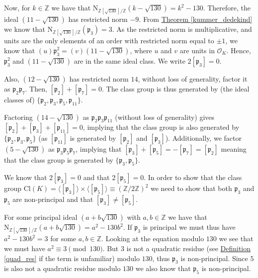 \documentclass[openany, a4paper, 10pt]{book}
\theoremstyle{plain}
\theoremstyle{plain}
\theoremstyle{plain}
\theoremstyle{definition}
\theoremstyle{plain}
\theoremstyle{definition}
\theoremstyle{remark}
\newcommand{\defref}[1]{\hyperref[#1]{Definition \ref{#1}}}
\newcommand{\theoref}[1]{\hyperref[#1]{Theorem \ref{#1}}}
\begin{document}
\begin{examplebox}
    Now, for $k \in \mathbb Z$ we have that $\mathrm{N}_{\mathbb Z[\sqrt{130}] / \mathbb Z} (k-\sqrt{130}) = k^2 - 130$.
    Therefore, the ideal $(11-\sqrt{130})$ has restricted norm $-9$.
    From \theoref{kummer_dedekind} we know that $\mathrm{N}_{\mathbb Z[\sqrt{130}] / \mathbb Z} (\mathfrak p_3) = 3$.
    As the restricted norm is multiplicative, and units are the only elements of an order with restricted norm equal to $\pm 1$, we know that $(u)\mathfrak p_3^2 = (v)(11 - \sqrt{130})$, where $u$ and $v$ are units in $\mathcal O_K$.
    Hence, $\mathfrak p_3^2$ and $(11 - \sqrt{130})$ are in the same ideal class.
    We write $2[\mathfrak p_3] = 0$.

    Also, $(12-\sqrt{130})$ has restricted norm $14$, without loss of generality, factor it as $\mathfrak p_2 \mathfrak p_7$.
    Then, $[\mathfrak p_2] + [\mathfrak p_7] = 0$.
    The class group is thus generated by (the ideal classes of) $\{ \mathfrak p_2, \mathfrak p_3, \mathfrak p_5, \mathfrak p_{11} \}$.

    Factoring $(14-\sqrt{130})$ as $\mathfrak p_2 \mathfrak p_3 \mathfrak p_{11}$ (without loss of generality) gives $[\mathfrak p_2] +  [\mathfrak p_3] +  [\mathfrak p_{11}] = 0$,
    implying that the class group is also generated by $\{ \mathfrak p_2, \mathfrak p_3, \mathfrak p_5\}$ (as $[\mathfrak p_{11}]$ is generated by $[\mathfrak p_2]$ and $[\mathfrak p_3]$).
    Additionally, we factor $(5-\sqrt{130})$ as $\mathfrak p_3 \mathfrak p_5 \mathfrak p_7$,
    implying that $[\mathfrak p_3] + [\mathfrak p_5] = -[\mathfrak p_7] = [\mathfrak p_2]$ meaning that the class group is generated by $\{ \mathfrak p_3, \mathfrak p_5 \}$.

    We know that $2[\mathfrak p_3] = 0$ and that $2[\mathfrak p_5] = 0$.
    In order to show that the class group $\mathrm{Cl}(K) = \langle [\mathfrak p_3] \rangle \times \langle [\mathfrak p_5] \rangle \equiv (\mathbb Z / 2 \mathbb Z)^2$
    we need to show that both $\mathfrak p_3$ and $\mathfrak p_5$ are non-principal and that $[\mathfrak p_3] \neq [\mathfrak p_5]$.

    For some principal ideal $(a+b\sqrt{130})$ with $a, b \in \mathbb Z$ we have that $\mathrm{N}_{\mathbb Z[\sqrt{130}] / \mathbb Z} (a + b\sqrt{130}) = a^2 - 130 b^2$.
    If $\mathfrak p_3$ is principal we must thus have $a^2-130b^2 = 3$ for some $a, b \in \mathbb Z$.
    Looking at the equation modulo $130$ we see that we must have $a^2 \equiv 3 \pmod {130}$.
    But $3$ is not a quadratic residue (see \defref{quad_res} if the term is unfamiliar) modulo $130$, thus $\mathfrak p_3$ is non-principal.
    Since $5$ is also not a quadratic residue modulo $130$ we also know that $\mathfrak p_5$ is non-principal.


\end{examplebox}
\end{document}
